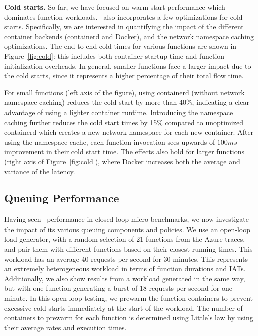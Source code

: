 \noindent \textbf{Cold starts.}
So far, we have focused on warm-start performance which dominates function workloads.
\sysname~also incorporates a few optimizations for cold starts. 
Specifically, we are interested in quantifying the impact of the different container backends (containerd and Docker), and the network namespace caching optimizations. 
The end to end cold times for various functions are shown in Figure~\ref{fig:cold}: this includes both container startup time and function initialization overheads. 
In general, smaller functions face a larger impact due to the cold starts, since it represents a higher percentage of their total flow time. 


For small functions (left axis of the figure), using containerd (without network namespace caching) reduces the cold start by more than 40\%, indicating a clear advantage of using a lighter container runtime.
Introducing the namespace caching further reduces the cold start times by 15\% compared to unoptimized containerd which creates a new network namespace for each new container. 
After using the namespace cache, each function invocation sees upwards of $100 ms$ improvement in their cold start time.
%
The effects also hold for larger functions (right axis of Figure~\ref{fig:cold}), where Docker increases both the average and variance of the latency. 

\subsection{Queuing Performance}
\label{sec:eval:q}

Having seen \sysname~performance in closed-loop micro-benchmarks, we now investigate the impact of its various queuing components and policies.
We use an open-loop load-generator, with a random selection of 21 functions from the Azure traces, and pair them with different functions based on their closest running times.
This  workload has an average 40 requests per second for 30 minutes. 
This represents an extremely heterogeneous workload in terms of function durations and IATs.
Additionally, we also show results from a  workload generated in the same way, but with one function generating a burst of 18 requests per second for one minute.
In this open-loop testing, we prewarm the function containers to prevent excessive cold starts immediately at the start of the workload.
The number of containers to prewarm for each function is determined using Little's law by using their average rates and execution times. 

